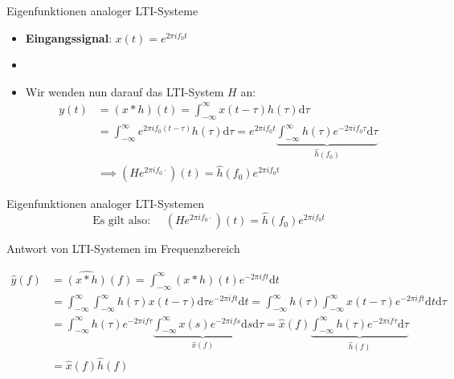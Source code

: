 \documentclass[14pt, aspectratio=169, handout]{beamer}
\begin{document}
\begin{frame}{Eigenfunktionen analoger LTI-Systeme}
    \begin{itemize}
        \item \textbf{Eingangssignal}: $x(t)= e^{2\pi i f_0 t}$
        \item[] 
        \item[] Wir wenden nun darauf das LTI-System $H$ an:
        \begin{align*}
            y(t) &= (x \ast h)(t) = \int_{-\infty}^\infty x(t-\tau)h(\tau) \text{d}\tau \\
            &=\int_{-\infty}^\infty e^{2 \pi i f_0 (t-\tau)} h(\tau) \text{d}\tau = e^{2 \pi i f_0 t} \underbrace{\int_{-\infty}^\infty h(\tau) e^{-2\pi i f_0 \tau} \text{d}\tau}_{\hat{h}(f_0)} \\
            &\implies (He^{2 \pi i f_0 \cdot})(t) = \hat{h}(f_0)e^{2 \pi i f_0 t}
        \end{align*}
    \end{itemize}
\end{frame}

\begin{frame}{Eigenfunktionen analoger LTI-Systemen}
    $$\text{Es gilt also: } \hspace{12pt} (He^{2 \pi i f_0 \cdot})(t) = \hat{h}(f_0)e^{2 \pi i f_0 t}$$
    \vspace{0.25cm}
\end{frame}

\begin{frame}{Antwort von LTI-Systemen im Frequenzbereich}
  \begin{small} \begin{align*}
    \hat{y}(f) &= \widehat{(x \ast h)}(f) = \int_{-\infty}^\infty (x\ast h)(t)e^{-2\pi i f t}\text{d}t\\
               &= \int_{-\infty}^\infty \int_{-\infty}^\infty h(\tau)x(t-\tau)\text{d}\tau e^{-2 \pi i f t}\text{d}t
               = \int_{-\infty}^\infty h(\tau) \int_{-\infty}^\infty x(t-\tau) e^{-2\pi ift} \text{d}t\text{d}\tau\\
               &= \int_{-\infty}^\infty h(\tau)e^{-2\pi if\tau} \underbrace{\int_{-\infty}^\infty x(s)e^{-2\pi ifs}\text{d}s}_{\hat{x}(f)}\text{d}\tau
    = \hat{x}(f)\underbrace{\int_{-\infty}^{\infty} h(\tau)e^{-2\pi if\tau}\text{d}\tau}_{\hat{h}(f)}\\ &= \hat{x}(f)\hat{h}(f)
  \end{align*} \end{small}
\end{frame}
\end{document}
